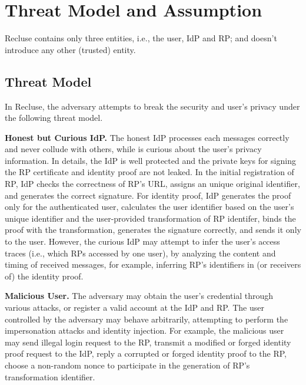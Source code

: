 \section{Threat Model and Assumption}
\label{sec:assumptionandthreatmodel}
Recluse contains only three entities, i.e., the user, IdP and RP; and doesn't introduce any other (trusted) entity.


\subsection{Threat Model}
In Recluse, the adversary attempts to break the security and user's privacy under the following threat model.

\textbf{Honest but Curious IdP.} 
The honest IdP processes each messages correctly and never collude with others, while is curious about the user's privacy information.
In details, the IdP is well protected and the private keys for signing the RP certificate and identity proof are not leaked. 
In the initial registration of RP,  IdP checks the correctness of RP's URL,  assigns an unique original identifier, and generates the correct signature. 
For identity proof, IdP generates the proof only for the authenticated user, calculates the user identifier based on the user's unique identifier 
and the user-provided transformation of RP identifer, binds the proof with the transformation, generates the signature correctly, 
and sends it only to the user.
However, the curious IdP may attempt to infer the user's access traces (i.e., which RPs accessed by one user), 
by analyzing the content and timing of received messages, for example, inferring RP's identifiers in (or receivers of) the identity proof.

\textbf{Malicious User.} %
The adversary may obtain the user's credential through various attacks, or register a valid account at the IdP and RP. 
The user controlled by the adversary may behave arbitrarily, attempting to perform the impersonation attacks and identity injection. 
For example, the malicious user  may send illegal login request to the RP, 
transmit a modified or forged identity proof request to the IdP, 
reply a corrupted or forged identity proof to the RP, 
 choose a non-random nonce to participate in the generation of RP's transformation identifier.

